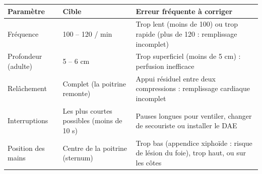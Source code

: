 \documentclass[11pt]{article}
\begin{document}
\begin{aretenir}
\begin{center}
\begin{tabularx}{\linewidth}{|l|X|X|}\hline
\rowcolor{popblueL} \textbf{Paramètre} & \textbf{Cible} & \textbf{Erreur fréquente à corriger} \\ \hline
Fréquence & 100 -- 120 / min & Trop lent (moins de 100) ou trop rapide (plus de 120 : remplissage incomplet) \\ \hline
Profondeur (adulte) & 5 -- 6 cm & Trop superficiel (moins de 5 cm) : perfusion inefficace \\ \hline
Relâchement & Complet (la poitrine remonte) & Appui résiduel entre deux compressions : remplissage cardiaque incomplet \\ \hline
Interruptions & Les plus courtes possibles (moins de 10 s) & Pauses longues pour ventiler, changer de secouriste ou installer le DAE \\ \hline
Position des mains & Centre de la poitrine (sternum) & Trop bas (appendice xiphoïde : risque de lésion du foie), trop haut, ou sur les côtes \\ \hline
\end{tabularx}
\end{center}
\end{aretenir}
\end{document}
